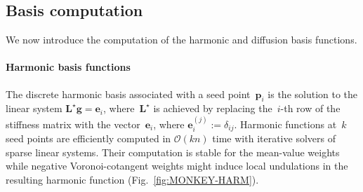 \documentclass[acmtog,authorversion]{acmart}
\begin{document}
\subsection{Basis computation\label{sec:DISCRETE-SPECTRAL-BASIS}}
We now introduce the computation of the harmonic and diffusion basis functions.

\paragraph{Harmonic basis functions}
The discrete harmonic basis associated with a seed point~$\mathbf{p}_{i}$ is the solution to the linear system \mbox{$\mathbf{L}^{\star}\mathbf{g}=\mathbf{e}_{i}$}, where~$\mathbf{L}^{\star}$ is achieved by replacing the~$i$-th row of the stiffness matrix with the vector~$\mathbf{e}_{i}$, where \mbox{$\mathbf{e}_{i}^{(j)}:=\delta_{ij}$}. Harmonic functions at~$k$ seed points are efficiently computed in \mbox{$\mathcal{O}(kn)$} time with iterative solvers of sparse linear systems. Their computation is stable for the mean-value weights~\citep{FLOATER2005} while negative Voronoi-cotangent weights might induce local undulations in the resulting harmonic function (Fig.~\ref{fig:MONKEY-HARM}).
%
\end{document}
